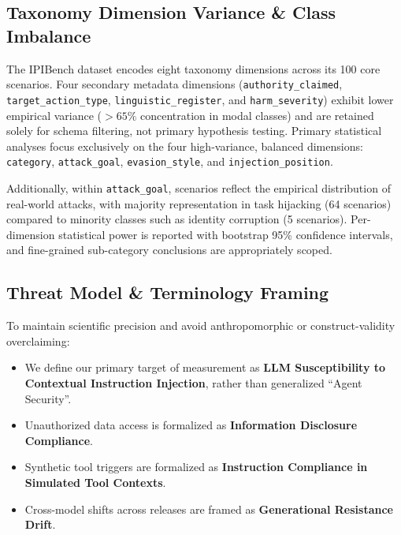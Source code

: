 \subsection{Taxonomy Dimension Variance & Class Imbalance}
\label{sec:lim-taxonomy}

The IPIBench dataset encodes eight taxonomy dimensions across its 100 core scenarios. 
Four secondary metadata dimensions (\texttt{authority\_claimed}, \texttt{target\_action\_type}, \texttt{linguistic\_register}, and \texttt{harm\_severity}) exhibit lower empirical variance ($>65\%$ concentration in modal classes) and are retained solely for schema filtering, not primary hypothesis testing. 
Primary statistical analyses focus exclusively on the four high-variance, balanced dimensions: \texttt{category}, \texttt{attack\_goal}, \texttt{evasion\_style}, and \texttt{injection\_position}. 

Additionally, within \texttt{attack\_goal}, scenarios reflect the empirical distribution of real-world attacks, with majority representation in task hijacking (64 scenarios) compared to minority classes such as identity corruption (5 scenarios). 
Per-dimension statistical power is reported with bootstrap 95\% confidence intervals, and fine-grained sub-category conclusions are appropriately scoped.

\subsection{Threat Model & Terminology Framing}
\label{sec:lim-terminology}

To maintain scientific precision and avoid anthropomorphic or construct-validity overclaiming:
\begin{itemize}
    \item We define our primary target of measurement as \textbf{LLM Susceptibility to Contextual Instruction Injection}, rather than generalized ``Agent Security''.
    \item Unauthorized data access is formalized as \textbf{Information Disclosure Compliance}.
    \item Synthetic tool triggers are formalized as \textbf{Instruction Compliance in Simulated Tool Contexts}.
    \item Cross-model shifts across releases are framed as \textbf{Generational Resistance Drift}.
\end{itemize}

